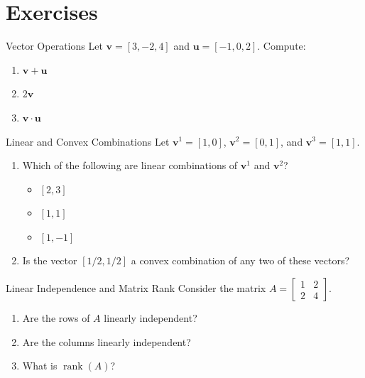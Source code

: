 \section{Exercises}


\begin{ex}{Vector Operations}{}
\label{ex:vector-operations}
Let \( \mathbf{v} = [3, -2, 4] \) and \( \mathbf{u} = [-1, 0, 2] \). Compute:
\begin{enumerate}
    \item \( \mathbf{v} + \mathbf{u} \)
    \item \( 2\mathbf{v} \)
    \item \( \mathbf{v} \cdot \mathbf{u} \)
\end{enumerate}
\exrefs{\S\ref{sec:math-preliminaries}}
\end{ex}

\begin{ex}{Linear and Convex Combinations}{}
Let \( \mathbf{v}^1 = [1, 0] \), \( \mathbf{v}^2 = [0, 1] \), and \( \mathbf{v}^3 = [1, 1] \).

\begin{enumerate}
    \item Which of the following are linear combinations of \( \mathbf{v}^1 \) and \( \mathbf{v}^2 \)?  
    \begin{itemize}
        \item[(a)] \( [2, 3] \)  
        \item[(b)] \( [1, 1] \)  
        \item[(c)] \( [1, -1] \)
    \end{itemize}
    \item Is the vector \( [1/2, 1/2] \) a convex combination of any two of these vectors?
\end{enumerate}
\exrefs{\S\ref{sec:math-preliminaries}, \S\ref{sec:convexity}}
\end{ex}

\begin{ex}{Linear Independence and Matrix Rank}{}
Consider the matrix \( A = \begin{bmatrix} 1 & 2 \\ 2 & 4 \end{bmatrix} \).
\begin{enumerate}
    \item Are the rows of \( A \) linearly independent?
    \item Are the columns linearly independent?
    \item What is \( \operatorname{rank}(A) \)?
\end{enumerate}
\exrefs{\S\ref{sec:math-preliminaries}}
\end{ex}


